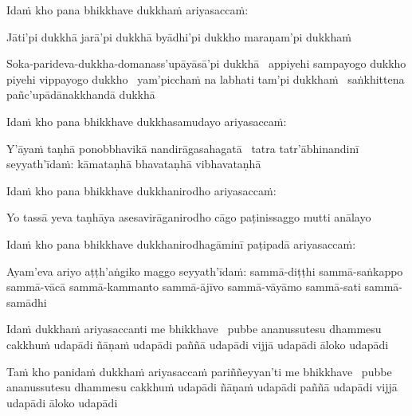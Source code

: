 \begin{pali-hang}
  Idaṁ kho pana bhikkhave dukkhaṁ ariyasaccaṁ:
\end{pali-hang}

\begin{pali-hang}
  Jāti'pi dukkhā jarā'pi dukkhā byādhi'pi dukkho maraṇam'pi dukkhaṁ
\end{pali-hang}

\begin{pali-hang}
   Soka-parideva-dukkha-domanass'upāyāsā'pi dukkhā \breathmark\ appiyehi sampayogo dukkho piyehi vippayogo dukkho \breathmark\ yam'picchaṁ na labhati tam'pi dukkhaṁ \breathmark\ saṅkhittena pañc'upādānakkhandā dukkhā
\end{pali-hang}

\begin{pali-hang}
  Idaṁ kho pana bhikkhave dukkhasamudayo ariyasaccaṁ:
\end{pali-hang}

\begin{pali-hang}
  Y'āyaṁ taṇhā ponobbhavikā nandirāgasahagatā \breathmark\ tatra tatr'ābhinandinī seyyath'īdaṁ: kāmataṇhā bhavataṇhā vibhavataṇhā
\end{pali-hang}

\begin{pali-hang}
  Idaṁ kho pana bhikkhave dukkhanirodho ariyasaccaṁ:
\end{pali-hang}

\begin{pali-hang}
  Yo tassā yeva taṇhāya asesavirāganirodho cāgo paṭinissaggo mutti anālayo
\end{pali-hang}

\begin{pali-hang}
  Idaṁ kho pana bhikkhave dukkhanirodhagāminī paṭipadā ariyasaccaṁ:
\end{pali-hang}

\begin{pali-hang}
  Ayam'eva ariyo aṭṭh'aṅgiko maggo seyyath'īdaṁ: sammā-diṭṭhi sammā-saṅkappo sammā-vācā sammā-kammanto sammā-ājīvo sammā-vāyāmo sammā-sati sammā-samādhi
\end{pali-hang}

\begin{pali-hang}
  Idaṁ dukkhaṁ ariyasaccanti me bhikkhave \breathmark\ pubbe ananussutesu dhammesu cakkhuṁ udapādi ñāṇaṁ udapādi paññā udapādi vijjā udapādi āloko udapādi
\end{pali-hang}

\begin{pali-hang}
  Taṁ kho panidaṁ dukkhaṁ ariyasaccaṁ pariññeyyan'ti me bhikkhave \breathmark\ pubbe ananussutesu dhammesu cakkhuṁ udapādi ñāṇaṁ udapādi paññā udapādi vijjā udapādi āloko udapādi
\end{pali-hang}

